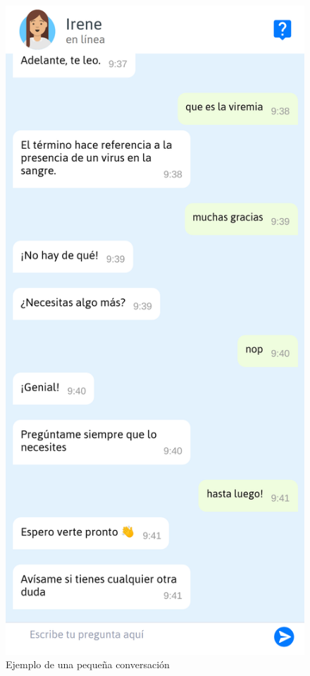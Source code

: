 \begin{figure}[htbp]
\includegraphics[scale=0.15]{../images/basics_chat_2.png}
\caption{Ejemplo de una pequeña conversación}
\label{fig:expresiones auxiliares}
\end{figure}

